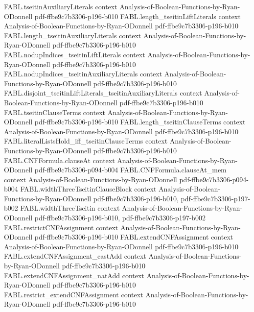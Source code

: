\begin{theorem}
\proofstep
  {FABL.tseitinAuxiliaryLiterals}
  {context}
  {Analysis-of-Boolean-Functions-by-Ryan-ODonnell}
  {pdf-ffbe9c7b3306-p196-b010}
\proofstep
  {FABL.length_tseitinLiftLiterals}
  {context}
  {Analysis-of-Boolean-Functions-by-Ryan-ODonnell}
  {pdf-ffbe9c7b3306-p196-b010}
\proofstep
  {FABL.length_tseitinAuxiliaryLiterals}
  {context}
  {Analysis-of-Boolean-Functions-by-Ryan-ODonnell}
  {pdf-ffbe9c7b3306-p196-b010}
\proofstep
  {FABL.nodupIndices_tseitinLiftLiterals}
  {context}
  {Analysis-of-Boolean-Functions-by-Ryan-ODonnell}
  {pdf-ffbe9c7b3306-p196-b010}
\proofstep
  {FABL.nodupIndices_tseitinAuxiliaryLiterals}
  {context}
  {Analysis-of-Boolean-Functions-by-Ryan-ODonnell}
  {pdf-ffbe9c7b3306-p196-b010}
\proofstep
  {FABL.disjoint_tseitinLiftLiterals_tseitinAuxiliaryLiterals}
  {context}
  {Analysis-of-Boolean-Functions-by-Ryan-ODonnell}
  {pdf-ffbe9c7b3306-p196-b010}
\proofstep
  {FABL.tseitinClauseTerms}
  {context}
  {Analysis-of-Boolean-Functions-by-Ryan-ODonnell}
  {pdf-ffbe9c7b3306-p196-b010}
\proofstep
  {FABL.length_tseitinClauseTerms}
  {context}
  {Analysis-of-Boolean-Functions-by-Ryan-ODonnell}
  {pdf-ffbe9c7b3306-p196-b010}
\proofstep
  {FABL.literalListsHold_iff_tseitinClauseTerms}
  {context}
  {Analysis-of-Boolean-Functions-by-Ryan-ODonnell}
  {pdf-ffbe9c7b3306-p196-b010}
\proofstep
  {FABL.CNFFormula.clauseAt}
  {context}
  {Analysis-of-Boolean-Functions-by-Ryan-ODonnell}
  {pdf-ffbe9c7b3306-p094-b004}
\proofstep
  {FABL.CNFFormula.clauseAt_mem}
  {context}
  {Analysis-of-Boolean-Functions-by-Ryan-ODonnell}
  {pdf-ffbe9c7b3306-p094-b004}
\proofstep
  {FABL.widthThreeTseitinClauseBlock}
  {context}
  {Analysis-of-Boolean-Functions-by-Ryan-ODonnell}
  {pdf-ffbe9c7b3306-p196-b010,
    pdf-ffbe9c7b3306-p197-b002}
\proofstep
  {FABL.widthThreeTseitin}
  {context}
  {Analysis-of-Boolean-Functions-by-Ryan-ODonnell}
  {pdf-ffbe9c7b3306-p196-b010,
    pdf-ffbe9c7b3306-p197-b002}
\proofstep
  {FABL.restrictCNFAssignment}
  {context}
  {Analysis-of-Boolean-Functions-by-Ryan-ODonnell}
  {pdf-ffbe9c7b3306-p196-b010}
\proofstep
  {FABL.extendCNFAssignment}
  {context}
  {Analysis-of-Boolean-Functions-by-Ryan-ODonnell}
  {pdf-ffbe9c7b3306-p196-b010}
\proofstep
  {FABL.extendCNFAssignment_castAdd}
  {context}
  {Analysis-of-Boolean-Functions-by-Ryan-ODonnell}
  {pdf-ffbe9c7b3306-p196-b010}
\proofstep
  {FABL.extendCNFAssignment_natAdd}
  {context}
  {Analysis-of-Boolean-Functions-by-Ryan-ODonnell}
  {pdf-ffbe9c7b3306-p196-b010}
\proofstep
  {FABL.restrict_extendCNFAssignment}
  {context}
  {Analysis-of-Boolean-Functions-by-Ryan-ODonnell}
  {pdf-ffbe9c7b3306-p196-b010}

\end{theorem}
